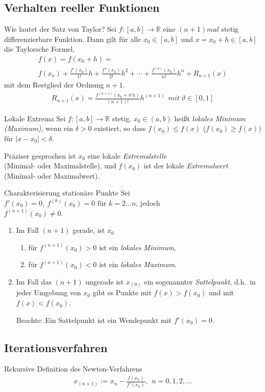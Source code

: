 \subsection{Verhalten reeller Funktionen}

\begin{karte}{Wie lautet der Satz von Taylor?}
	Sei $f:[a,b] \to \mathbb{R}$ eine $(n+1)mal$ stetig differenzierbare Funktion. Dann gilt für alle $x_0 \in [a,b]$ und $x=x_0 + h \in [a,b]$ die Taylorsche Formel,
	\begin{multline}
		f(x)=f(x_0+h)=\\ f(x_o) + \frac{f'(x_0)}{1!}h + \frac{f''(x_0)}{2!}h^2 +  \cdots+\frac{f^{(n)}(x_0)}{n!}h^n + R_{n+1}(x)
	\end{multline}
	mit dem Restglied der Ordnung $n+1$.\vspace{2.5mm}
	\begin{align}
		R_{n+1}(x) = \frac{f^{(n+1)}(x_0 + \vartheta\ h)}{(n+1)!}h^{(n+1)} \ \ mit \ \vartheta \in [0,1]
	\end{align}

\end{karte}

\begin{karte}{Lokale Extrema}
	Sei \(f:[a,b]\to\mathbb{R}\) stetig. \(x_0 \in (a,b)\) heißt \emph{lokales Minimum (Maximum)}, wenn ein \(\delta > 0\) existiert, so dass \(f(x_0)\leq f(x)\) (\(f(x_0)\geq f(x)) \) für \(\lvert x-x_0\rvert < \delta \).\par
	Präziser gesprochen ist \(x_0\) eine lokale \emph{Extremalstelle}\\ (Minimal- oder Maximalstelle), und \(f(x_0)\) ist der lokale \emph{Extremalwert} (Minimal- oder Maximalwert).
\end{karte}

\begin{karte}{Charakterisierung stationäre Punkte}
	Sei \(f'(x_0)=0,\ f^{(k)}(x_0)=0 \text{ für } k=2\dots n \), jedoch \\ \(f^{(n+1)} (x_0) \neq 0\).
	\begin{enumerate}[label=\(\triangleright \)]
		\item Im Fall \((n+1)\) gerade, ist \(x_0\)
		      \begin{enumerate}[label=--]
		      	\item für \( f^{(n+1)}(x_0)>0 \) ist ein \emph{lokales Minimum},
		      	\item für \( f^{(n+1)}(x_0)<0 \) ist ein \emph{lokales Maximum}.
		      \end{enumerate}
		\item Im Fall das \( (n+1) \) ungerade ist \(x_{(0)}\) ein sogenannter \emph{Sattelpunkt}, d.h.\ in jeder Umgebung von \(x_0\) gibt es Punkte mit \(f(x)>f(x_0)\) und mit \(f(x)<f(x_0)\).\vspace{5mm}\par
		      Beachte: Ein Sattelpunkt ist ein Wendepunkt mit \(f'(x_0)=0\).
	\end{enumerate}
\end{karte}
\subsection{Iterationsverfahren}
\begin{karte}{Rekursive Definition des Newton-Verfahrens}
	\begin{align}
		x_{(n+1)}:=x_{n}-\frac{f(x_n)}{f'(x_n)},\ \ n=0,1,2,\dots
	\end{align}
\end{karte}
